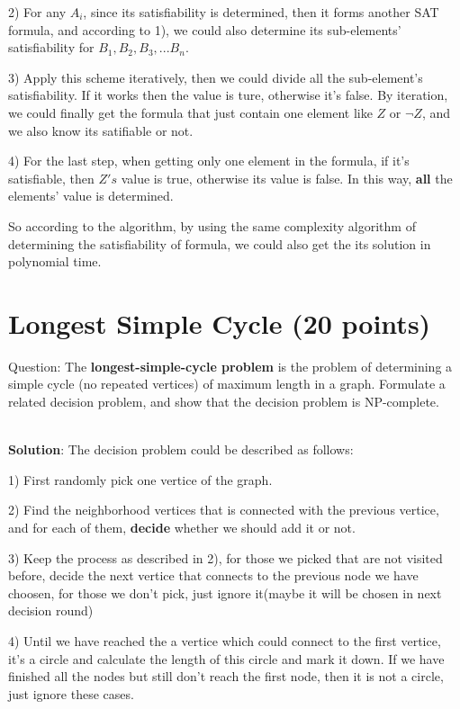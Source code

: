 \documentclass{article}
\begin{document}
2) For any $A_{i}$, since its satisfiability is determined, then it forms another SAT formula, and according to 1), we could also determine its sub-elements' satisfiability for ${B_{1}, B_{2}, B_{3}, ... B_{n}}$.

3) Apply this scheme iteratively, then we could divide all the sub-element's satisfiability. If it works then the value is ture, otherwise it's false. By iteration, we could finally get the formula that just contain one element like $Z$ or $\neg Z$, and we also know its satifiable or not.

4) For the last step, when getting only one element in the formula, if it's satisfiable, then $Z's$ value is true, otherwise its value is false. In this way, \textbf{all} the elements' value is determined.

So according to the algorithm, by using the same complexity algorithm of determining the satisfiability of formula, we could also get the its solution in polynomial time.

\section{Longest Simple Cycle (20 points)}
Question: The \textbf{longest-simple-cycle problem} is the problem of determining a simple cycle (no repeated vertices) of maximum length in a graph. Formulate a related decision problem, and show that the decision problem is NP-complete.

~\\
\textbf{Solution}:\newline
\indent The decision problem could be described as follows:

1) First randomly pick one vertice of the graph.

2) Find the neighborhood vertices that is connected with the previous vertice, and for each of them, \textbf{decide} whether we should add it or not. 

3) Keep the process as described in 2), for those we picked that are not visited before, decide the next vertice that connects to the previous node we have choosen, for those we don't pick, just ignore it(maybe it will be chosen in next decision round)

4) Until we have reached the a vertice which could connect to the first vertice, it's a circle and calculate the length of this circle and mark it down. If we have finished all the nodes but still don't reach the first node, then it is not a circle, just ignore these cases.
\end{document}
